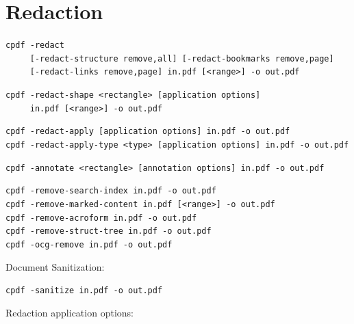 \documentclass{book}
\begin{document}
\clearpage\pagestyle{empty}
\chapter{Redaction}\label{chap:20}\pagestyle{fancy}

  {\small\begin{framed}
  \noindent\verb!cpdf -redact!\\
  \noindent\verb!     [-redact-structure remove,all] [-redact-bookmarks remove,page]!\\
  \noindent\verb!     [-redact-links remove,page] in.pdf [<range>] -o out.pdf!

  \vspace{1.5mm}
  \noindent\verb!cpdf -redact-shape <rectangle> [application options]!\\
  \noindent\verb!     in.pdf [<range>] -o out.pdf!

  \vspace{1.5mm}
  \noindent\verb!cpdf -redact-apply [application options] in.pdf -o out.pdf!\\
  \noindent\verb!cpdf -redact-apply-type <type> [application options] in.pdf -o out.pdf!

  \vspace{1.5mm}
  \noindent\verb!cpdf -annotate <rectangle> [annotation options] in.pdf -o out.pdf!

  \vspace{1.5mm}
  \noindent\verb!cpdf -remove-search-index in.pdf -o out.pdf!\\
  \noindent\verb!cpdf -remove-marked-content in.pdf [<range>] -o out.pdf!\\
  \noindent\verb!cpdf -remove-acroform in.pdf -o out.pdf!\\
  \noindent\verb!cpdf -remove-struct-tree in.pdf -o out.pdf!\\
  \noindent\verb!cpdf -ocg-remove in.pdf -o out.pdf!

  \vspace{3.5mm}
  \noindent Document Sanitization:

  \vspace{1.5mm}
  \noindent\verb!cpdf -sanitize in.pdf -o out.pdf!

  \vspace{3.5mm}
  \noindent Redaction application options:


\end{framed}}
\end{document}
